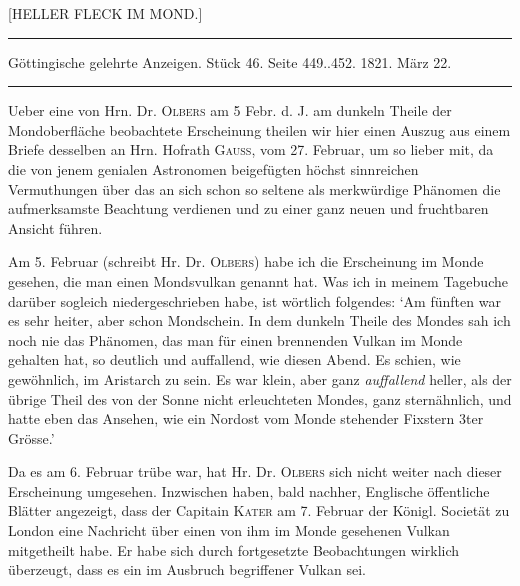 \clearpage
{}
\begin{center}
{\large [HELLER FLECK IM MOND.]}
\end{center}

\begin{center}
\noindent\rule{\linewidth}{0.4pt}

Göttingische gelehrte Anzeigen. Stück 46. Seite 449..452. 1821. März 22.

\noindent\rule{\linewidth}{0.4pt}
\end{center}

Ueber eine von Hrn. Dr. \textsc{Olbers} am 5 Febr. d. J. am dunkeln Theile der
Mondoberfläche beobachtete Erscheinung theilen wir hier einen Auszug aus einem Briefe
desselben an Hrn. Hofrath \textsc{Gauss}, vom 27. Februar, um so lieber mit, da die von
jenem genialen Astronomen beigefügten höchst sinnreichen Vermuthungen über das an sich
schon so seltene als merkwürdige Phänomen die aufmerksamste Beachtung verdienen und zu
einer ganz neuen und fruchtbaren Ansicht führen.

Am 5. Februar (schreibt Hr. Dr. \textsc{Olbers}) habe ich die Erscheinung im Monde
gesehen, die man einen Mondsvulkan genannt hat. Was ich in meinem Tagebuche darüber
sogleich niedergeschrieben habe, ist wörtlich folgendes: `Am fünften war es sehr heiter,
aber schon Mondschein. In dem dunkeln Theile des Mondes sah ich noch nie das Phänomen,
das man für einen brennenden Vulkan im Monde gehalten hat, so deutlich und auffallend,
wie diesen Abend. Es schien, wie gewöhnlich, im Aristarch zu sein. Es war klein, aber
ganz \emph{auffallend} heller, als der übrige Theil des von der Sonne nicht erleuchteten
Mondes, ganz sternähnlich, und hatte eben das Ansehen, wie ein Nordost vom Monde
stehender Fixstern 3ter Grösse.'

Da es am 6. Februar trübe war, hat Hr. Dr. \textsc{Olbers} sich nicht weiter nach dieser
Erscheinung umgesehen. Inzwischen haben, bald nachher, Englische öffentliche Blätter
angezeigt, dass der Capitain \textsc{Kater} am 7. Februar der Königl. Societät zu London
eine Nachricht über einen von ihm im Monde gesehenen Vulkan mitgetheilt habe. Er habe
sich durch fortgesetzte Beobachtungen wirklich überzeugt, dass es ein im Ausbruch
begriffener Vulkan sei.

